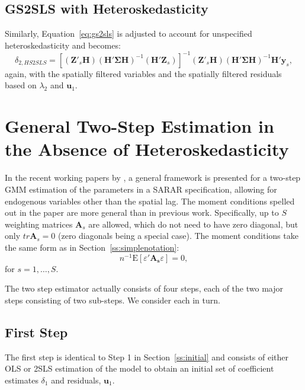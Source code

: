 \documentclass{article}
\begin{document}
\subsection{GS2SLS with Heteroskedasticity}
Similarly, Equation~\ref{eq:gs2sls} is adjusted to account for unspecified heteroskedasticity
and becomes:
\begin{equation*}
\delta_{2,HS2SLS} = [ ( \mathbf{Z'}_s \mathbf{H} )(\mathbf{H' \Sigma H})^{-1} ( \mathbf{H'} \mathbf{Z}_s ) ]^{-1} ( \mathbf{Z'}_s \mathbf{H} ) (\mathbf{H' \Sigma H})^{-1} \mathbf{H'} \mathbf{y}_s,
\end{equation*}
again, with the spatially filtered variables and the spatially filtered residuals based on $\lambda_2$
and $\mathbf{u}_1$.

\section{General Two-Step Estimation in the Absence of Heteroskedasticity}
In the recent working papers by \cite{Drukkeretal:10,Drukkeretal:11}, a general framework is presented
for a two-step GMM estimation of the parameters in a SARAR specification, allowing
for endogenous variables other than the spatial lag. The moment conditions spelled out in the
paper are more general than in previous work.
Specifically, up to $S$ weighting matrices $\mathbf{A}_s$ are allowed, which do not need
to have zero diagonal, but only $tr \mathbf{A}_s = 0$ (zero diagonals being a special
case). The moment conditions take the same form as in Section~\ref{ss:simplenotation}:
\begin{equation}\label{eq:generalmomenteq}
 n^{-1} \mbox{E}[\varepsilon' \mathbf{A_s} \varepsilon ] = 0,
\end{equation}
for $s = 1, \dots, S$.
 
 The two step estimator actually consists of four steps, each of the two major
 steps consisting of two sub-steps. We consider each in turn.
 
 \subsection{First Step}
 The first step is identical to Step 1 in Section~\ref{ss:initial} and consists of either
 OLS or 2SLS estimation of the model to obtain an initial set of 
 coefficient estimates $\delta_1$ and residuals, $\mathbf{u}_1$.
 
\end{document}
